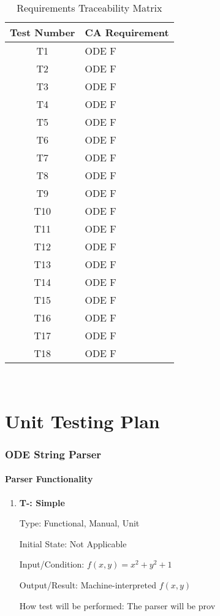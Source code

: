 \documentclass[12pt, titlepage]{article}
\newcounter{tnum} %
\begin{document}
\begin{table} [H]
  \caption{Requirements Traceability Matrix}
  \label{Table:Table_Traceability}  
\begin{tabular}{|c|p{12cm}|}
  \hline	
  \textbf{Test Number} & \textbf{CA Requirement}\\
  \hline 
   T1& ODE F\\ \hline
   T2& ODE F\\ \hline
   T3& ODE F\\ \hline
   T4& ODE F\\ \hline
   T5& ODE F\\ \hline
   T6& ODE F\\ \hline
   T7& ODE F\\ \hline
   T8& ODE F\\ \hline
   T9& ODE F\\ \hline
   T10& ODE F\\ \hline
   T11& ODE F\\ \hline
   T12& ODE F\\ \hline
   T13& ODE F\\ \hline
   T14& ODE F\\ \hline
   T15& ODE F\\ \hline
   T16& ODE F\\ \hline
   T17& ODE F\\ \hline
   T18& ODE F\\ \hline

\end{tabular}\\
\end{table}
				
\section{Unit Testing Plan}
		

\subsubsection{ODE String Parser}

\paragraph{Parser Functionality}

\begin{enumerate}

\item{\textbf{T-\thetnum \label{t-parser1}: Simple}}

Type: Functional, Manual, Unit 
					
Initial State: Not Applicable
					
Input/Condition: $f(x, y) = x^2 + y^2 + 1$
					
Output/Result: Machine-interpreted $f(x, y)$
					
How test will be performed: The parser will be prov

\end{enumerate}
		
\end{document}
